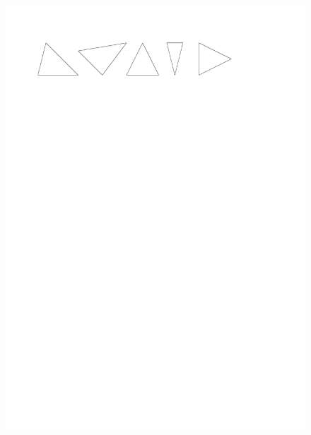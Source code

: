 \documentclass[11pt]{article}
\begin{document}
\begin{figure}[H]
  \centering
  \includegraphics[width=\linewidth]{5x2-triangles/sources/ex1.1.pdf}
\end{figure}
\end{document}

